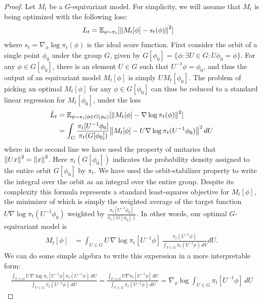 \documentclass{article}
\theoremstyle{plain}
\theoremstyle{definition}
\theoremstyle{remark}
\begin{document}
\begin{proof}
Let $M_t$ be a $G$-equivariant model. For simplicity, we will assume that $M_t$ is being optimized with the following loss:
\begin{align}\label{eq:score_matching}
    L_t &= \mathbb{E}_{\phi \sim \pi_t}[\norm{M_t[\phi] - s_t(\phi)}^2]
\end{align}
where $s_t = \nabla_{\phi} \log \pi_t(\phi)$ is the ideal score function. First consider the orbit of a single point $\phi_0$ under the group $G$, given by $G[\phi_0] = \{ \phi : \exists U \in G: U \phi_0 = \phi \}$. For any $\phi \in G[\phi_0]$, there is an element $U\in G$ such that $U^{-1} \phi = \phi_0$, and thus the output of an equivariant model $M_t[\phi]$ is simply $U M_t[\phi_0]$. The problem of picking an optimal $M_t[\phi]$ for any $\phi \in G[\phi_0]$ can thus be reduced to a standard linear regression for $M_t[\phi_0]$, under the loss
\begin{align*}
    \tilde{L}_t &= \mathbb{E}_{\phi \sim \pi_t | \phi \in G(\phi_0)}[\norm{M_t[\phi] - \nabla \log \pi_t(\phi)}^2]\\
    &= \int_G \frac{\pi_{t}[U^{-1}\phi_0]}{\pi_t(G[\phi_0])} \norm{ M_t[\phi] - U \nabla \log \pi_t(U^{-1} \phi_0)}^2 \,dU
\end{align*}
where in the second line we have used the property of unitaries that $\norm{U x}^2 = \norm{x}^2$. Here $\pi_t(G[\phi_0])$ indicates the probability density assigned to the entire orbit $G[\phi_0]$ by $\pi_t$. We have used the orbit-stabilizer property to write the integral over the orbit as an integral over the entire group. Despite its complexity this formula represents a standard least-squares objective for $M_t[\phi]$, the minimizer of which is simply the weighted average of the target function $U \nabla \log \pi_t(U^{-1} \phi_0)$ weighted by $\frac{\pi_t[U^{-1}\phi_0]}{\pi_t(G[\phi_0])}$.
In other words, our optimal $G$-equivariant model is
\begin{equation}
\begin{split}
    M_t[\phi] &= \int_{U \in G} U\, \nabla \log \pi_t[U^{-1} \phi]\,\frac{\pi_t(U^{-1}\phi)}{\int_{V\in G} \pi_t(V^{-1} \phi)\,dV} dU.
\end{split}
\end{equation}
We can do some simple algebra to write this experssion in a more interpretable form:
\begin{align*}
    \frac{\int_{U \in G} U\, \nabla \log \pi_t[U^{-1} \phi]\pi_t(U^{-1}\phi)\,dU}{\int_{U\in G} \pi_t(U^{-1} \phi)\,dU} = \frac{\int_{U \in G} U\nabla \pi_t[U^{-1}\phi]\,dU }{\int_{U \in G} \pi_{t}(U^{-1} \phi)\,dU}= \nabla_\phi \log \int_{U \in G} \pi_t[U^{-1} \phi]\,dU

\end{align*}
\end{proof}
\end{document}
